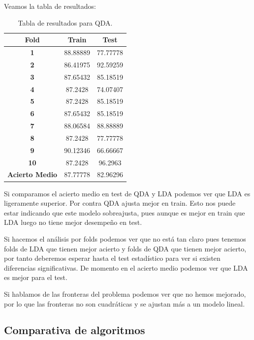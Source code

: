 \documentclass[12pt,a4paper]{article}
\begin{document}
Veamos la tabla de resultados:

\begin{table}[H]
	\centering
	\begin{tabular}{|c|c|c|}
		\hline
		\textbf{Fold}          & \textbf{Train} & \textbf{Test} \\ \hline
		\textbf{1}             & 88.88889       & 77.77778      \\ \hline
		\textbf{2}             & 86.41975       & 92.59259      \\ \hline
		\textbf{3}             & 87.65432       & 85.18519      \\ \hline
		\textbf{4}             & 87.2428       & 74.07407      \\ \hline
		\textbf{5}             & 87.2428       & 85.18519      \\ \hline
		\textbf{6}             & 87.65432       & 85.18519      \\ \hline
		\textbf{7}             & 88.06584       & 88.88889       \\ \hline
		\textbf{8}             & 87.2428       & 77.77778      \\ \hline
		\textbf{9}             & 90.12346       & 66.66667      \\ \hline
		\textbf{10}            & 87.2428       & 96.2963       \\ \hline
		\textbf{Acierto Medio} & 87.77778       & 82.96296      \\ \hline
	\end{tabular}
	\caption{Tabla de resultados para QDA.}
\end{table}

Si comparamos el acierto medio en test de QDA y LDA podemos ver que LDA es ligeramente superior. Por contra QDA ajusta mejor en train. Esto nos puede estar indicando que este modelo sobreajusta, pues aunque es mejor en train que LDA luego no tiene mejor desempeño en test.

Si hacemos el análisis por folds podemos ver que no está tan claro pues tenemos folds de LDA que tienen mejor acierto y folds de QDA que tienen mejor acierto, por tanto deberemos esperar hasta el test estadístico para ver si existen diferencias significativas. De momento en el acierto medio podemos ver que LDA es mejor para el test.

Si hablamos de las fronteras del problema podemos ver que no  hemos mejorado, por lo que las fronteras no son cuadráticas y se ajustan más a un modelo lineal.

\subsection{Comparativa de algoritmos}
\end{document}
